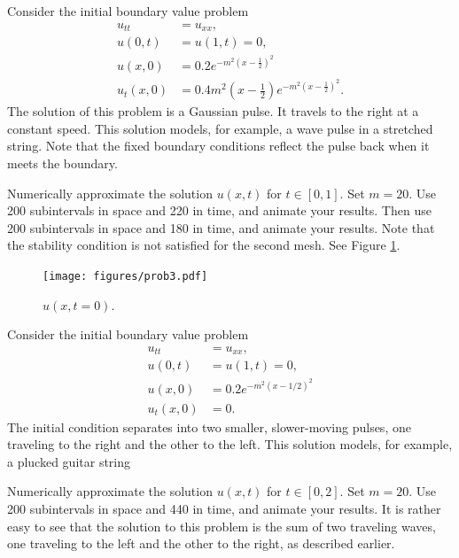 \begin{problem}
\label{prob:prob3}
Consider the initial boundary value problem
\begin{align*}
	u_{tt} &= u_{xx}, \\
	u(0,t) &= u(1,t) = 0, \\
	u(x,0) &= 0.2e^{-m^2 \left(x - \frac 1 2 \right)^2}\\
	u_t(x,0) &= 0.4m^2 \left(x - \frac 1 2\right)e^{-m^2 \left(x - \frac 1 2 \right)^2}.
\end{align*}
The solution of this problem is a Gaussian pulse.
It travels to the right at a constant speed.
This solution models, for example, a wave pulse in a stretched string.
Note that the fixed boundary conditions reflect the pulse back when it meets the boundary.

Numerically approximate the solution $u(x,t)$ for $t \in \left[0, 1\right]$.
Set $m=20$.
Use 200 subintervals in space and 220 in time, and animate your results.
Then use 200 subintervals in space and 180 in time, and animate your results.
Note that the stability condition is not satisfied for the second mesh.
See Figure \ref{fig:waveeqn:prob3}.

\begin{figure}[H]
\centering
\texttt{[image: figures/prob3.pdf]}
\caption{$u(x,t=0)$.}
\label{fig:waveeqn:prob3}
\end{figure}
\end{problem}

\begin{problem}
Consider the initial boundary value problem
\begin{align*}
	u_{tt} &= u_{xx}, \\
	u(0,t) &= u(1,t) = 0, \\
	u(x,0) &= 0.2e^{-m^2(x-1/2)^2}\\
	u_t(x,0) &= 0.
\end{align*}
The initial condition separates into two smaller, slower-moving pulses, one traveling to the right and the other to the left.
This solution models, for example, a plucked guitar string

Numerically approximate the solution $u(x,t)$ for $t \in \left[0,2\right]$.
Set $m=20$.
Use 200 subintervals in space and 440 in time, and animate your results.
It is rather easy to see that the solution to this problem is the sum of two traveling waves, one traveling to the left and the other to the right, as described earlier.
\end{problem}

